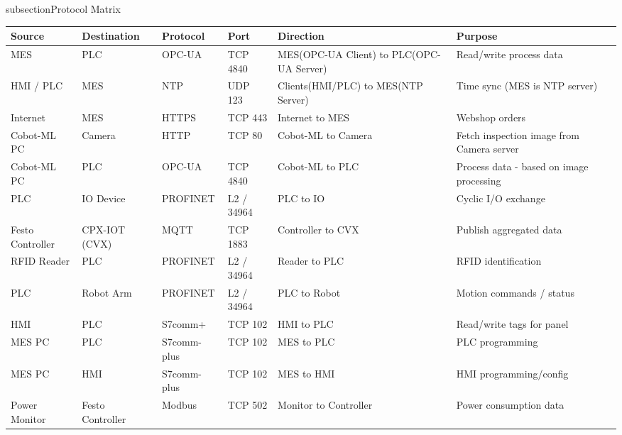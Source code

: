 subsection{Protocol Matrix}
{\small
\setlength{\tabcolsep}{4pt}
\begin{longtable}{L{2.6cm} L{2.2cm} L{1.8cm} L{1.6cm} L{3.4cm} L{3.2cm}}
\toprule
\textbf{Source} & \textbf{Destination} & \textbf{Protocol} & \textbf{Port} & \textbf{Direction} & \textbf{Purpose} \\
\midrule \endhead
    MES & PLC & OPC-UA & TCP 4840 & MES(OPC-UA Client) to
    PLC(OPC-UA Server) & Read/write process data \\ 

    HMI / PLC & MES & NTP & UDP 123 &
    Clients(HMI/PLC) to MES(NTP Server) & Time sync (MES is NTP server) \\

    Internet & MES & HTTPS & TCP 443 & Internet to MES &
    Webshop orders \\ 

    Cobot-ML PC & Camera & HTTP & TCP 80 & Cobot-ML to
    Camera & Fetch inspection image from Camera server \\ 

    Cobot-ML PC & PLC & OPC-UA & TCP 4840 & Cobot-ML to PLC & 
    Process data - based on image processing \\

    PLC & IO Device & PROFINET &
    L2 / 34964 & PLC to IO & Cyclic I/O exchange \\ 

    Festo Controller & CPX-IOT (CVX) & MQTT & TCP 1883 &
    Controller to CVX & Publish aggregated data \\ 

    RFID Reader & PLC & PROFINET & L2 / 34964 & Reader to PLC &
    RFID identification \\ 

    PLC & Robot Arm & PROFINET & L2 /
    34964 & PLC to Robot & Motion commands / status \\ 

    HMI & PLC & S7comm+ & TCP 102 & HMI to PLC & Read/write
    tags for panel \\ 

    MES PC & PLC & S7comm-plus & TCP 102 & MES to PLC & PLC programming \\ 

    MES PC & HMI & S7comm-plus & TCP 102 & MES to HMI & HMI
    programming/config \\ 

    Power Monitor & Festo Controller & Modbus & TCP 502
    & Monitor to Controller & Power consumption data \\

\bottomrule
\end{longtable}
}
